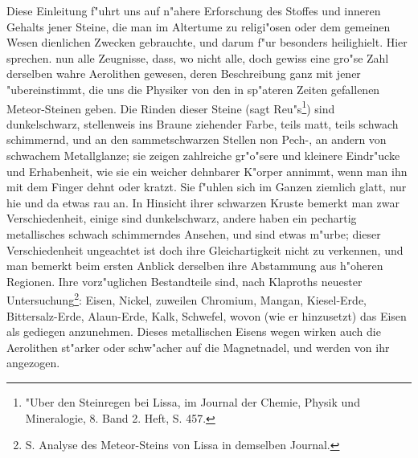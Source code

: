 \documentclass[a4paper, 11pt, oneside, polutonikogreek, german]{article}
\begin{document}
Diese Einleitung f"uhrt uns auf n"ahere Erforschung des Stoffes und inneren Gehalts jener Steine, die man im Altertume zu religi"osen oder dem gemeinen Wesen dienlichen Zwecken gebrauchte, und darum f"ur besonders heilighielt. Hier sprechen. nun alle Zeugnisse, dass, wo nicht alle, doch gewiss eine gro"se Zahl derselben wahre Aerolithen gewesen, deren Beschreibung ganz mit jener "ubereinstimmt, die uns die Physiker von den in sp"ateren Zeiten gefallenen Meteor-Steinen geben. Die Rinden dieser Steine (sagt Reu"s\footnote{"Uber den Steinregen bei Lissa, im Journal der Chemie, Physik und Mineralogie, 8. Band 2. Heft, S. 457.}) sind dunkelschwarz, stellenweis ins Braune ziehender Farbe, teils matt, teils schwach schimmernd, und an den sammetschwarzen Stellen non Pech-, an andern von schwachem Metallglanze; sie zeigen zahlreiche gr"o"sere und kleinere Eindr"ucke und Erhabenheit, wie sie ein weicher dehnbarer K"orper annimmt, wenn man ihn mit dem Finger dehnt oder kratzt. Sie f"uhlen sich im Ganzen ziemlich glatt, nur hie und da etwas rau an. In Hinsicht ihrer schwarzen Kruste bemerkt man zwar Verschiedenheit, einige sind dunkelschwarz, andere haben ein pechartig metallisches schwach schimmerndes Ansehen, und sind etwas m"urbe; dieser Verschiedenheit ungeachtet ist doch ihre Gleichartigkeit nicht zu verkennen, und man bemerkt beim ersten Anblick derselben ihre Abstammung aus h"oheren Regionen. Ihre vorz"uglichen Bestandteile sind, nach Klaproths neuester Untersuchung\footnote{S. Analyse des Meteor-Steins von Lissa in demselben Journal.}: Eisen, Nickel, zuweilen Chromium, Mangan, Kiesel-Erde, Bittersalz-Erde, Alaun-Erde, Kalk, Schwefel, wovon (wie er hinzusetzt) das Eisen als gediegen anzunehmen. Dieses metallischen Eisens wegen wirken auch die Aerolithen st"arker oder schw"acher auf die Magnetnadel, und werden von ihr angezogen.
\end{document}
